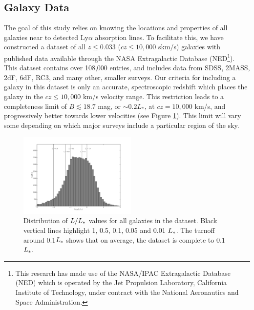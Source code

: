 \documentclass[iop]{emulateapj-rtx4}
\begin{document}
\subsection{Galaxy Data}

The goal of this study relies on knowing the locations and properties of all galaxies near to detected Ly$\alpha$ absorption lines. To facilitate this, we have constructed a dataset of all $z\leq 0.033$ ($cz\leq 10,000$ skm/s) galaxies with published data available through the NASA Extragalactic Database (NED\footnote{This research has made use of the NASA/IPAC Extragalactic Database (NED) which is operated by the Jet Propulsion Laboratory, California Institute of Technology, under contract with the National Aeronautics and Space Administration.}). This dataset contains over 108,000 entries, and includes data from SDSS, 2MASS, 2dF, 6dF, RC3, and many other, smaller surveys. Our criteria for including a galaxy in this dataset is only an accurate, spectroscopic redshift which places the galaxy in the $cz \leq 10,000$ km/s velocity range. This restriction leads to a completeness limit of $B \lesssim 18.7$ mag, or $\sim0.2 L_*$, at $cz = 10,000$ km/s, and progressively better towards lower velocities (see Figure \ref{completeness}). This limit will vary some depending on which major surveys include a particular region of the sky. 

\begin{figure}[ht!]
        \centering
        \vspace{-10pt}
        \includegraphics[width=0.52\textwidth]{completeness_hist.pdf}
        \caption{\small{Distribution of $L/L_{\**}$ values for all galaxies in the dataset. Black vertical lines highlight 1, 0.5, 0.1, 0.05 and 0.01 $L_{\**}$. The turnoff around 0.1$L_{\**}$ shows that on average, the dataset is complete to 0.1$L_{\**}$.}}
        \label{completeness}
\end{figure} 
\end{document}

